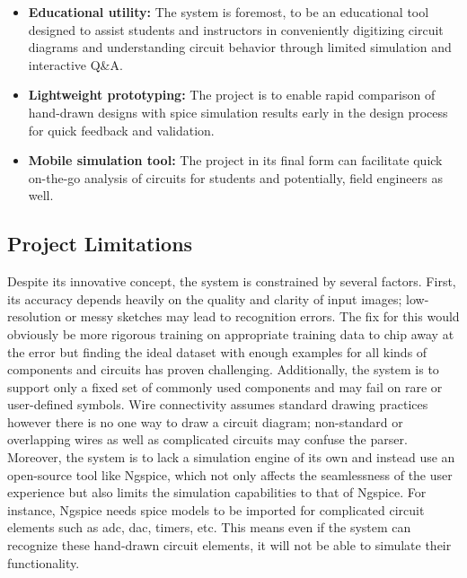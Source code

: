 \begin{itemize}
    \item \textbf{Educational utility:} The system is foremost, to be an educational tool designed to assist students and instructors in conveniently digitizing circuit diagrams and understanding circuit behavior through limited simulation and interactive Q\&A.
    \item \textbf{Lightweight prototyping:} The project is to enable rapid comparison of hand-drawn designs with \gls{spice} simulation results early in the design process for quick feedback and validation.
    \item \textbf{Mobile simulation tool:} The project in its final form can facilitate quick on-the-go analysis of circuits for students and potentially, field engineers as well.
\end{itemize}

\subsection{Project Limitations}

Despite its innovative concept, the system is constrained by several factors. First, its accuracy depends heavily on the quality and clarity of input images; low-resolution or messy sketches may lead to recognition errors. The fix for this would obviously be more rigorous training on appropriate training data to chip away at the error but finding the ideal dataset with enough examples for all kinds of components and circuits has proven challenging. Additionally, the system is to support only a fixed set of commonly used components and may fail on rare or user-defined symbols. Wire connectivity assumes standard drawing practices however there is no one way to draw a circuit diagram; non-standard or overlapping wires as well as complicated circuits may confuse the parser. Moreover, the system is to lack a simulation engine of its own and instead use an open-source tool like Ngspice, which not only affects the seamlessness of the user experience but also limits the simulation capabilities to that of Ngspice. For instance, Ngspice needs \gls{spice} models to be imported for complicated circuit elements such as \gls{adc}, \gls{dac}, timers, etc. This means even if the system can recognize these hand-drawn circuit elements, it will not be able to simulate their functionality.